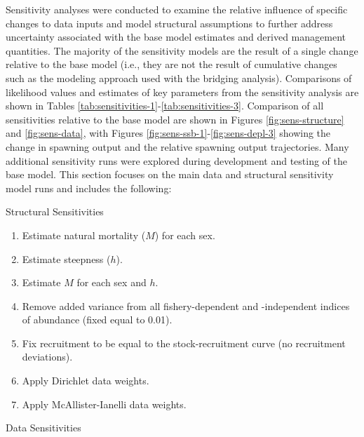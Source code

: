\documentclass[11pt,
  letterpaper,
]{article}
\begin{document}
Sensitivity analyses were conducted to examine the relative influence of specific changes to data inputs and model structural assumptions to further address uncertainty associated with the base model estimates and derived management quantities. The majority of the sensitivity models are the result of a single change relative to the base model (i.e., they are not the result of cumulative changes such as the modeling approach used with the bridging analysis). Comparisons of likelihood values and estimates of key parameters from the sensitivity analysis are shown in Tables \ref{tab:sensitivities-1}-\ref{tab:sensitivities-3}. Comparison of all sensitivities relative to the base model are shown in Figures \ref{fig:sens-structure} and \ref{fig:sens-data}, with Figures \ref{fig:sens-ssb-1}-\ref{fig:sens-depl-3} showing the change in spawning output and the relative spawning output trajectories. Many additional sensitivity runs were explored during development and testing of the base model. This section focuses on the main data and structural sensitivity model runs and includes the following:

Structural Sensitivities

\begin{enumerate}
   
  \item  Estimate natural mortality ($M$) for each sex.
  
  \item Estimate steepness ($h$).
  
  \item Estimate $M$ for each sex and $h$.
  
  \item Remove added variance from all fishery-dependent and -independent indices of abundance (fixed equal to 0.01).
  
  \item Fix recruitment to be equal to the stock-recruitment curve (no recruitment deviations).
  
  \item Apply Dirichlet data weights.
  
  \item Apply McAllister-Ianelli data weights.

\end{enumerate}

Data Sensitivities
\end{document}
